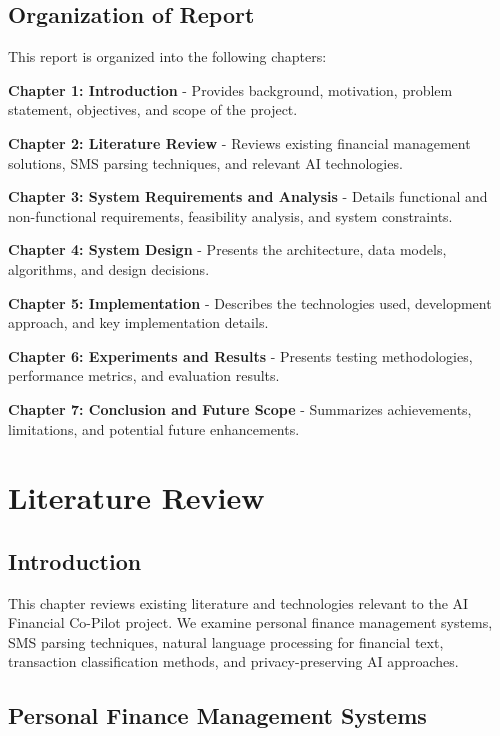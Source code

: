 \documentclass[11pt,a4paper]{report}
\begin{document}
\section{Organization of Report}

This report is organized into the following chapters:

\textbf{Chapter 1: Introduction} - Provides background, motivation, problem statement, objectives, and scope of the project.

\textbf{Chapter 2: Literature Review} - Reviews existing financial management solutions, SMS parsing techniques, and relevant AI technologies.

\textbf{Chapter 3: System Requirements and Analysis} - Details functional and non-functional requirements, feasibility analysis, and system constraints.

\textbf{Chapter 4: System Design} - Presents the architecture, data models, algorithms, and design decisions.

\textbf{Chapter 5: Implementation} - Describes the technologies used, development approach, and key implementation details.

\textbf{Chapter 6: Experiments and Results} - Presents testing methodologies, performance metrics, and evaluation results.

\textbf{Chapter 7: Conclusion and Future Scope} - Summarizes achievements, limitations, and potential future enhancements.

\chapter{Literature Review}

\section{Introduction}

This chapter reviews existing literature and technologies relevant to the AI Financial Co-Pilot project. We examine personal finance management systems, SMS parsing techniques, natural language processing for financial text, transaction classification methods, and privacy-preserving AI approaches.

\section{Personal Finance Management Systems}
\end{document}
